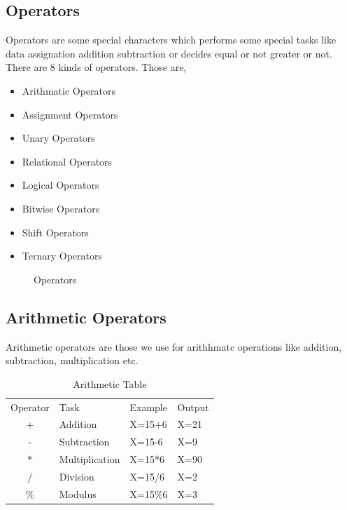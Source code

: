\documentclass[openany]{book}  %
\begin{document}
\begin{flushleft}
    \chapter{Operators}
    Operators\cite{Ref8} are some special characters which performs some special tasks like data assignation addition subtraction or decides equal or not greater or not.
    There are 8 kinds of operators. Those are,
    \begin{itemize}
        \item Arithmatic Operators
        \item Assignment Operators
        \item Unary Operators
        \item Relational Operators
        \item Logical Operators
        \item Bitwise Operators
        \item Shift Operators
        \item Ternary Operators
    \end{itemize}
    \begin{figure}[htbp]
        \begin{center}
            \caption{Operators\cite{Ref8}}
        \end{center}
    \end{figure}
    \section{Arithmetic Operators}
    Arithmetic operators\cite{Ref8} are those we use for arithhmatc operations like addition, subtraction, multiplication etc.
    \begin{table}[htbp]
        \begin{tabular}{clll}
            \multicolumn{1}{l}{Operator} & Task           & Example & Output \\
            +                            & Addition       & X=15+6  & X=21   \\
            -                            & Subtraction    & X=15-6  & X=9    \\
            $*$                          & Multiplication & X=15*6  & X=90   \\
            /                            & Division       & X=15/6  & X=2    \\
            \%                           & Modulus        & X=15\%6 & X=3
        \end{tabular}
        \centering
        \caption{Arithmetic Table}
    \end{table}

\end{flushleft}
\end{document}
